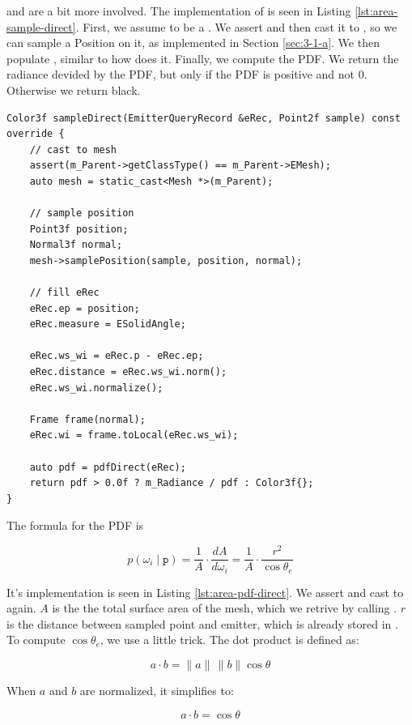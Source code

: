  and  are a bit more involved. The implementation of  is seen in Listing \ref{lst:area-sample-direct}. First, we assume  to be a . We assert and then cast it to , so we can sample a Position on it, as implemented in Section \ref{sec:3-1-a}. We then populate , similar to how  does it. Finally, we compute the PDF. We return the radiance devided by the PDF, but only if the PDF is positive and not 0. Otherwise we return black.

\begin{lstlisting}[caption={\code{AreaLight::sampleDirect}},label={lst:area-sample-direct}]
Color3f sampleDirect(EmitterQueryRecord &eRec, Point2f sample) const override {
    // cast to mesh
    assert(m_Parent->getClassType() == m_Parent->EMesh);
    auto mesh = static_cast<Mesh *>(m_Parent);
    
    // sample position
    Point3f position;
    Normal3f normal;
    mesh->samplePosition(sample, position, normal);
    
    // fill eRec
    eRec.ep = position;
    eRec.measure = ESolidAngle;
    
    eRec.ws_wi = eRec.p - eRec.ep;
    eRec.distance = eRec.ws_wi.norm();
    eRec.ws_wi.normalize();
    
    Frame frame(normal);
    eRec.wi = frame.toLocal(eRec.ws_wi);
    
    auto pdf = pdfDirect(eRec);
    return pdf > 0.0f ? m_Radiance / pdf : Color3f{};
}
\end{lstlisting}

The formula for the PDF is

\[
p(\omega_i \mid \texttt{p}) = \frac{1}{A} \cdot \frac{dA}{d\omega_i} = \frac{1}{A} \cdot \frac{r^2}{\cos\theta_e}
\]

It's implementation is seen in Listing \ref{lst:area-pdf-direct}. We assert and cast to  again. $A$ is the the total surface area of the mesh, which we retrive by calling . $r$ is the distance between sampled point and emitter, which is already stored in . To compute $\cos\theta_e$, we use a little trick. The dot product is defined as:

\[
a \cdot b = \|a\| \, \|b\| \cos\theta
\]

When $a$ and $b$ are normalized, it simplifies to:

\[
    a\cdot b = \cos\theta
\]

